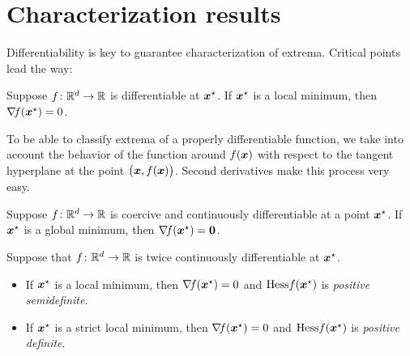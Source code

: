 \section{Characterization results}

Differentiability is key to guarantee characterization of extrema.  Critical points lead the way:

\begin{theorem}\label{theorem:criticalGivesMinima}
Suppose $f\colon \mathbb{R}^d \to \mathbb{R}$ is differentiable at $\boldsymbol{x}^{\star}$.  If $\boldsymbol{x}^{\star}$ is a local minimum, then $\mathop{\nabla\! {f}}(\boldsymbol{x}^{\star})=0$.
\end{theorem}

To be able to classify extrema of a properly differentiable function, we take into account the behavior of the function around $f(\boldsymbol{x})$ with respect to the tangent hyperplane at the point $\big(\boldsymbol{x}, f(\boldsymbol{x})\big)$.  Second derivatives make this process very easy.

\begin{theorem}\label{theorem:coerciveMinima}
Suppose $f \colon \mathbb{R}^d \to \mathbb{R}$ is coercive and continuously differentiable at a point $\boldsymbol{x}^{\star}$.  If $\boldsymbol{x}^{\star}$ is a global minimum, then $\mathop{\nabla\! {f}}(\boldsymbol{x}^{\star})= \boldsymbol{0}$.
\end{theorem}

\begin{theorem}\label{theorem:necessaryMinima}
Suppose that $f\colon \mathbb{R}^d \to \mathbb{R}$ is twice continuously differentiable at $\boldsymbol{x}^{\star}$.  
\begin{itemize}
\item If $\boldsymbol{x}^{\star}$ is a local minimum, then $\mathop{\nabla\! {f}}(\boldsymbol{x}^{\star})=0$ and $\mathop{\mathrm{Hess}{f}}(\boldsymbol{x}^{\star})$ is \emph{positive semidefinite}.
\item If $\boldsymbol{x}^{\star}$ is a strict local minimum, then $\mathop{\nabla\! {f}}(\boldsymbol{x}^{\star})=0$ and $\mathop{\mathrm{Hess}{f}}(\boldsymbol{x}^{\star})$ is \emph{positive definite}.
\end{itemize}
\end{theorem}


